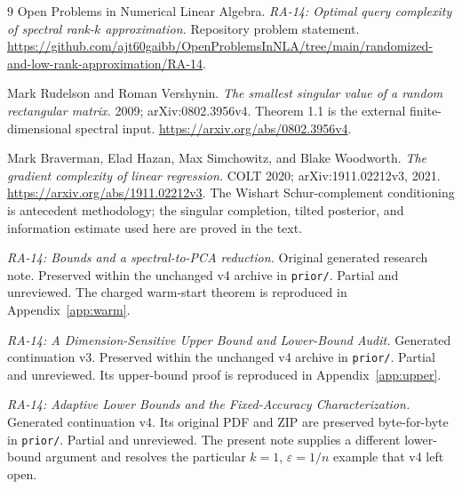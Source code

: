 \documentclass[11pt]{article}
\numberwithin{equation}{section}
\theoremstyle{remark}\newtheorem{remark}[theorem]{Remark}
\newcommand{\eps}{\varepsilon}
\begin{document}
\begingroup
\small
\setlength{\parskip}{0pt}
\begin{thebibliography}{9}
\setlength{\itemsep}{2pt}
Open Problems in Numerical Linear Algebra.
\emph{RA-14: Optimal query complexity of spectral rank-$k$ approximation.}
Repository problem statement.
\url{https://github.com/ajt60gaibb/OpenProblemsInNLA/tree/main/randomized-and-low-rank-approximation/RA-14}.

Mark Rudelson and Roman Vershynin.
\emph{The smallest singular value of a random rectangular matrix.}
2009; arXiv:0802.3956v4. Theorem 1.1 is the external finite-dimensional spectral input.
\url{https://arxiv.org/abs/0802.3956v4}.

Mark Braverman, Elad Hazan, Max Simchowitz, and Blake Woodworth.
\emph{The gradient complexity of linear regression.}
COLT 2020; arXiv:1911.02212v3, 2021.
\url{https://arxiv.org/abs/1911.02212v3}.
The Wishart Schur-complement conditioning is antecedent methodology; the singular completion, tilted posterior, and information estimate used here are proved in the text.

\emph{RA-14: Bounds and a spectral-to-PCA reduction.}
Original generated research note. Preserved within the unchanged v4 archive in \texttt{prior/}. Partial and unreviewed. The charged warm-start theorem is reproduced in Appendix~\ref{app:warm}.

\emph{RA-14: A Dimension-Sensitive Upper Bound and Lower-Bound Audit.}
Generated continuation v3. Preserved within the unchanged v4 archive in \texttt{prior/}. Partial and unreviewed. Its upper-bound proof is reproduced in Appendix~\ref{app:upper}.

\emph{RA-14: Adaptive Lower Bounds and the Fixed-Accuracy Characterization.}
Generated continuation v4. Its original PDF and ZIP are preserved byte-for-byte in \texttt{prior/}. Partial and unreviewed. The present note supplies a different lower-bound argument and resolves the particular $k=1$, $\eps=1/n$ example that v4 left open.
\end{thebibliography}
\endgroup
\end{document}
